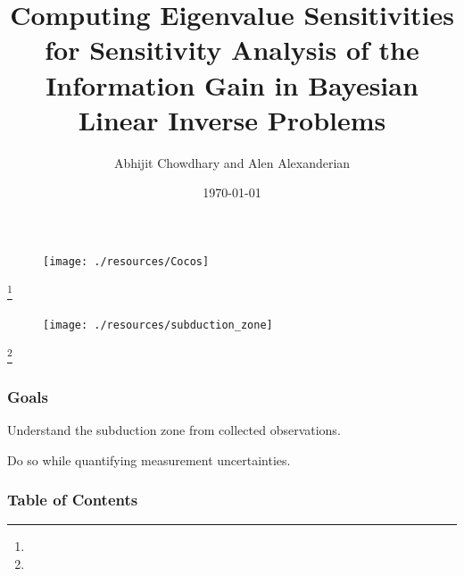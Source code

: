 \documentclass[
  pdf,
  10pt,
  xcolor={svgnames},
]{beamer}
\title[%
  Eigenvalue Sensitivities for Sensitivity Analysis
]{%
  Computing Eigenvalue Sensitivities for Sensitivity Analysis of the Information
  Gain in Bayesian Linear Inverse Problems
}
\author[Chowdhary, Alexanderian]{%
  Abhijit Chowdhary and Alen Alexanderian
}
\institute[NCSU]{
  Department of Mathematics \\
  North Carolina State University
}
\date[AMGSS 2022]{\today}
\newcommand\blfootnote[1]{%
  \begingroup
  \renewcommand\thefootnote{}\footnote{\scriptsize #1}%
  \addtocounter{footnote}{-1}%
  \endgroup
}
\begin{document}

\begin{frame}
  \begin{figure}
    \centering
    \texttt{[image: ./resources/Cocos]}
  \end{figure}
  \blfootnote{}
\end{frame}

\begin{frame}
  \begin{figure}
    \centering
    \texttt{[image: ./resources/subduction\_zone]}
  \end{figure}
  \blfootnote{}
\end{frame}

\begin{frame}
  \frametitle{Goals}
  \begin{alertblock}{}
    \begin{center}
      {\large Understand the subduction zone from collected observations.}
    \end{center}
  \end{alertblock}
  \pause
  \begin{alertblock}{}
    \begin{center}
      {\large Do so while quantifying measurement uncertainties.}
    \end{center}
  \end{alertblock}
\end{frame}

\begin{frame}
  \frametitle{Table of Contents}
  \tableofcontents
\end{frame}

\end{document}
